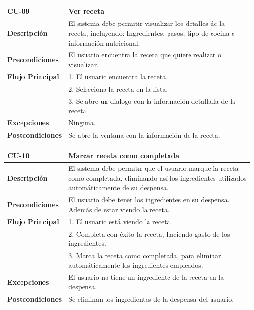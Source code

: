 \begin{table}[H]
\begin{tabular}{|m{3cm}|m{9cm}|}
\hline
\textbf{CU-09} & Ver receta \\
\hline
\textbf{Descripción} & El sistema debe permitir visualizar los detalles de la receta, incluyendo: Ingredientes, pasos, tipo de cocina e información nutricional. \\
\hline
\textbf{Precondiciones} & El usuario encuentra la receta que quiere realizar o visualizar. \\
\hline
\textbf{Flujo Principal} & 
1. El usuario encuentra la receta. \\
& 2. Selecciona la receta en la lista. \\
& 3. Se abre un dialogo con la información detallada de la receta \\
\hline
\textbf{Excepciones} & Ninguna. \\
\hline
\textbf{Postcondiciones} & Se abre la ventana con la información de la receta.\\
\hline
\end{tabular}
\label{Tab:Cu-09}
\end{table}
\begin{table}[H]
\begin{tabular}{|m{3cm}|m{9cm}|}
\hline
\textbf{CU-10} & Marcar receta como completada \\
\hline
\textbf{Descripción} & El sistema debe permitir que el usuario marque la receta como completada, eliminando así los ingredientes utilizados automáticamente de su despensa.  \\
\hline
\textbf{Precondiciones} & El usuario debe tener los ingredientes en su despensa. Además de estar viendo la receta. \\
\hline
\textbf{Flujo Principal} & 
1. El usuario está viendo la receta. \\
& 2. Completa con éxito la receta, haciendo gasto de los ingredientes. \\
& 3. Marca la receta como completada, para eliminar automáticamente los ingredientes empleados.  \\
\hline
\textbf{Excepciones} & El usuario no tiene un ingrediente de la receta en la despensa. \\
\hline
\textbf{Postcondiciones} & Se eliminan los ingredientes de la despensa del usuario.\\
\hline
\end{tabular}
\label{Tab:Cu-09}
\end{table}

